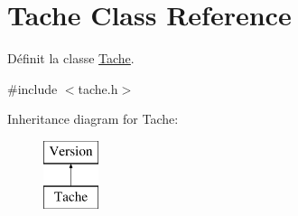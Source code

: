 \hypertarget{class_tache}{}\section{Tache Class Reference}
\label{class_tache}


Définit la classe \hyperlink{class_tache}{Tache}.  




{\ttfamily \#include $<$tache.\+h$>$}

Inheritance diagram for Tache\+:\begin{figure}[H]
\begin{center}
\leavevmode
\includegraphics[height=2.000000cm]{class_tache}
\end{center}
\end{figure}
